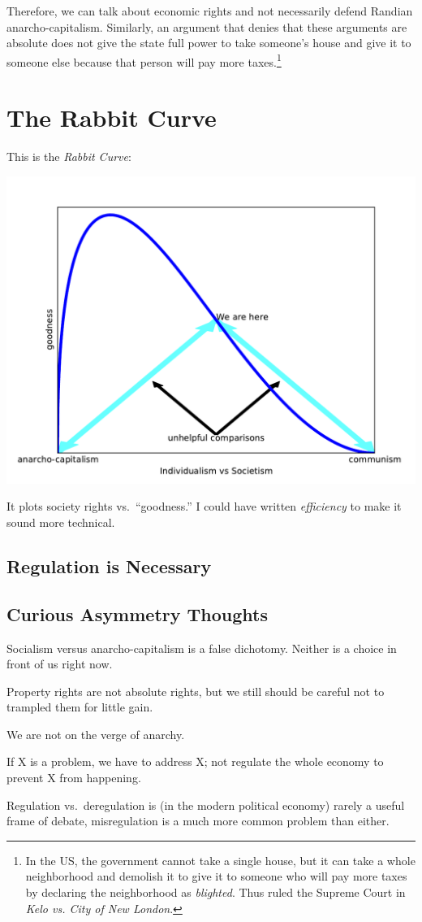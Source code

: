 Therefore, we can talk about economic rights and not necessarily defend Randian
anarcho-capitalism. Similarly, an argument that denies that these arguments are
absolute does not give the state full power to take someone's house and give it
to someone else because that person will pay more taxes.\footnote{In the US,
the government cannot take a single house, but it can take a whole neighborhood
and demolish it to give it to someone who will pay more taxes by declaring the
neighborhood as \emph{blighted}. Thus ruled the Supreme Court in \emph{Kelo vs.
City of New London}.}

\section{The Rabbit Curve}

This is the \emph{Rabbit Curve}:

\includegraphics[width=.8\textwidth]{images/rabbit-curve.pdf}

It plots society rights vs.\ ``goodness.'' I could have written
\emph{efficiency} to make it sound more technical.

\subsection{Regulation is Necessary}



\subsection{Curious Asymmetry Thoughts}

\thought Socialism versus anarcho-capitalism is a false dichotomy. Neither is a
choice in front of us right now.

\thought Property rights are not absolute rights, but we still should be
careful not to trampled them for little gain.

\thought We are not on the verge of anarchy.

\thought If X is a problem, we have to address X; not regulate the whole
economy to prevent X from happening.

\thought Regulation vs.\ deregulation is (in the modern political economy)
rarely a useful frame of debate, misregulation is a much more common problem
than either.

